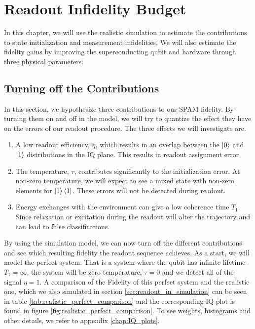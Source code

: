 \chapter{Readout Infidelity Budget} \label{chap:budget}
In this chapter, we will use the realistic simulation to estimate the contributions to state initialization and measurement infidelities. We will also estimate the fidelity gains by improving the superconducting qubit and hardware through three physical parameters. 

\section{Turning off the Contributions}
In this section, we hypothesize three contributions to our SPAM fidelity. By  turning them on and off in the model, we will try to quantize the effect they have on the errors of our readout procedure. The three effects we will investigate are.
\begin{enumerate}
    \item A low readout efficiency, $\eta$, which results in an overlap between the $\ket{0}$ and $\ket{1}$ distributions in the IQ plane. This results in readout assignment error 
    \item The temperature, $\tau$, contributes significantly to the initialization error. At non-zero temperature, we will expect to see a mixed state with non-zero elements for $\ket{1}\bra{1}$. These errors will not be detected during readout. 
    \item Energy exchanges with the environment can give a low coherence time $T_1$. Since relaxation or excitation during the readout will alter the trajectory and can lead to false classifications.
\end{enumerate}
By using the simulation model, we can now turn off the different contributions and see which resulting fidelity the readout sequence achieves. As a start, we will model the perfect system. That is a system where the qubit has infinite lifetime $T_1 = \infty$, the system will be zero temperature, $\tau = 0$ and we detect all of the signal $\eta = 1$. A comparison of the Fidelity of this perfect system and the realistic one, which we also simulated in section \ref{sec:readout_in_simulation} can be seen in table \ref{tab:realistic_perfect_comparison} and the corresponding IQ plot is found in figure \ref{fig:realistic_perfect_comparison}. To see weights, histograms and other details, we refer to appendix \ref{chap:IQ_plots}.
